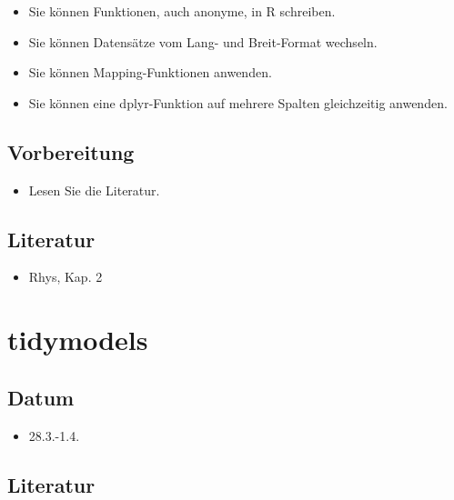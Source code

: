 \documentclass[
]{book}
\providecommand{\tightlist}{%
  \setlength{\itemsep}{0pt}\setlength{\parskip}{0pt}}
\begin{document}
\begin{itemize}
\tightlist
\item
  Sie können Funktionen, auch anonyme, in R schreiben.
\item
  Sie können Datensätze vom Lang- und Breit-Format wechseln.
\item
  Sie können Mapping-Funktionen anwenden.
\item
  Sie können eine dplyr-Funktion auf mehrere Spalten gleichzeitig anwenden.
\end{itemize}

\hypertarget{vorbereitung-1}{%
\subsection{Vorbereitung}\label{vorbereitung-1}}

\begin{itemize}
\tightlist
\item
  Lesen Sie die Literatur.
\end{itemize}

\hypertarget{literatur-2}{%
\subsection{Literatur}\label{literatur-2}}

\begin{itemize}
\tightlist
\item
  Rhys, Kap. 2
\end{itemize}

\hypertarget{tidymodels}{%
\section{tidymodels}\label{tidymodels}}

\hypertarget{datum-2}{%
\subsection{Datum}\label{datum-2}}

\begin{itemize}
\tightlist
\item
  28.3.-1.4.
\end{itemize}

\hypertarget{literatur-3}{%
\subsection{Literatur}\label{literatur-3}}
\end{document}
